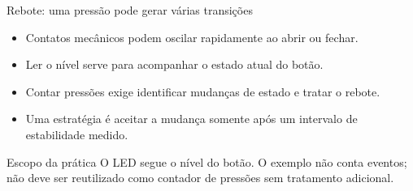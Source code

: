 \begin{frame}[t]{Rebote: uma pressão pode gerar várias transições}
\begin{itemize}
\item Contatos mecânicos podem oscilar rapidamente ao abrir ou fechar.
\item Ler o nível serve para acompanhar o estado atual do botão.
\item Contar pressões exige identificar mudanças de estado e tratar o rebote.
\item Uma estratégia é aceitar a mudança somente após um intervalo de estabilidade medido.
\end{itemize}
\begin{block}{Escopo da prática}
O LED segue o nível do botão. O exemplo não conta eventos; não deve ser reutilizado como contador de pressões sem tratamento adicional.
\end{block}
\end{frame}
